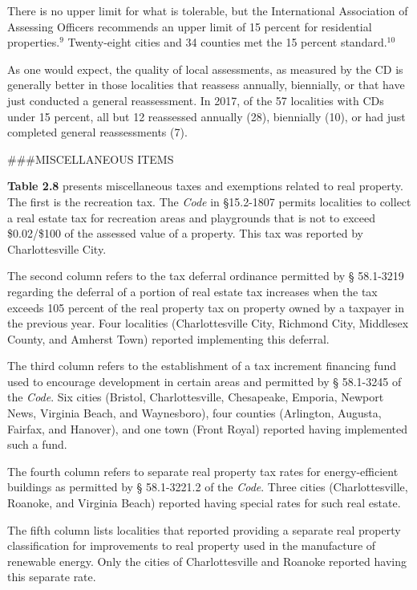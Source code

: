 \documentclass[
]{book}
\begin{document}
There is no upper limit for what is tolerable, but the International Association of Assessing Officers recommends an upper limit of 15 percent for residential properties.\(^9\) Twenty-eight cities and 34 counties met the 15 percent standard.\(^10\)

As one would expect, the quality of local assessments, as measured by the CD is generally better in those localities that reassess annually, biennially, or that have just conducted a general reassessment. In 2017, of the 57 localities with CDs under 15 percent, all but 12 reassessed annually (28), biennially (10), or had just completed general reassessments (7).

\#\#\#MISCELLANEOUS ITEMS

\textbf{Table 2.8} presents miscellaneous taxes and exemptions related to real property. The first is the recreation tax. The \emph{Code} in §15.2-1807 permits localities to collect a real estate tax for recreation areas and playgrounds that is not to exceed \$0.02/\$100 of the assessed value of a property. This tax was reported by Charlottesville City.

The second column refers to the tax deferral ordinance permitted by § 58.1-3219 regarding the deferral of a portion of real estate tax increases when the tax exceeds 105 percent of the real property tax on property owned by a taxpayer in the previous year. Four localities (Charlottesville City, Richmond City, Middlesex County, and Amherst Town) reported implementing this deferral.

The third column refers to the establishment of a tax increment financing fund used to encourage development in certain areas and permitted by § 58.1-3245 of the \emph{Code}. Six cities (Bristol, Charlottesville, Chesapeake, Emporia, Newport News, Virginia Beach, and Waynesboro), four counties (Arlington, Augusta, Fairfax, and Hanover), and one town (Front Royal) reported having implemented such a fund.

The fourth column refers to separate real property tax rates for energy-efficient buildings as permitted by § 58.1-3221.2 of the \emph{Code}. Three cities (Charlottesville, Roanoke, and Virginia Beach) reported having special rates for such real estate.

The fifth column lists localities that reported providing a separate real property classification for improvements to real property used in the manufacture of renewable energy. Only the cities of Charlottesville and Roanoke reported having this separate rate.
\end{document}
